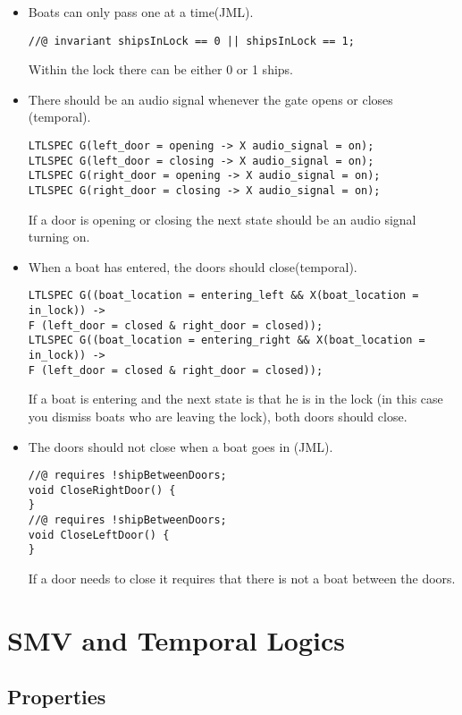 \documentclass[a4paper]{article}
\begin{document}
\begin{itemize}
		\item Boats can only pass one at a time(JML).
		\begin{lstlisting}
//@ invariant shipsInLock == 0 || shipsInLock == 1;
		\end{lstlisting}
		Within the lock there can be either 0 or 1 ships.
		
		\item There should be an audio signal whenever the gate opens or closes (temporal).
		\begin{lstlisting}
LTLSPEC G(left_door = opening -> X audio_signal = on);
LTLSPEC G(left_door = closing -> X audio_signal = on);
LTLSPEC G(right_door = opening -> X audio_signal = on);
LTLSPEC G(right_door = closing -> X audio_signal = on);
		\end{lstlisting}
		If a door is opening or closing the next state should be an audio signal turning on.
		
		\item When a boat has entered, the doors should close(temporal).
		\begin{lstlisting}
LTLSPEC G((boat_location = entering_left && X(boat_location = in_lock)) ->
F (left_door = closed & right_door = closed));
LTLSPEC G((boat_location = entering_right && X(boat_location = in_lock)) ->
F (left_door = closed & right_door = closed));
		\end{lstlisting}
		If a boat is entering and the next state is that he is in the lock (in this case you dismiss boats who are leaving the lock), both doors should close.
		
		\item The doors should not close when a boat goes in (JML).
		\begin{lstlisting}
//@ requires !shipBetweenDoors;
void CloseRightDoor() {
}
//@ requires !shipBetweenDoors;
void CloseLeftDoor() {
}
		\end{lstlisting}
		If a door needs to close it requires that there is not a boat between the doors.
	\end{itemize}
	
	\section{SMV and Temporal Logics}
	
	
	\subsection{Properties}
	
\end{document}
